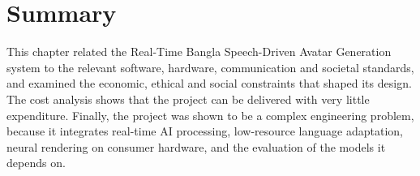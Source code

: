 \section{Summary}

This chapter related the Real-Time Bangla Speech-Driven Avatar Generation system to the relevant software, hardware, communication and societal standards, and examined the economic, ethical and social constraints that shaped its design.\\

\noindent
The cost analysis shows that the project can be delivered with very little expenditure. Finally, the project was shown to be a complex engineering problem, because it integrates real-time AI processing, low-resource language adaptation, neural rendering on consumer hardware, and the evaluation of the models it depends on.

